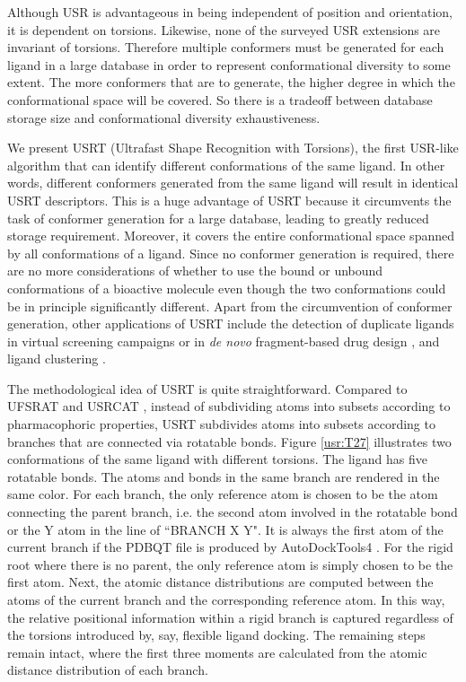 Although USR is advantageous in being independent of position and orientation, it is dependent on torsions. Likewise, none of the surveyed USR extensions are invariant of torsions. Therefore multiple conformers must be generated for each ligand in a large database in order to represent conformational diversity to some extent. The more conformers that are to generate, the higher degree in which the conformational space will be covered. So there is a tradeoff between database storage size and conformational diversity exhaustiveness.

We present USRT (Ultrafast Shape Recognition with Torsions), the first USR-like algorithm that can identify different conformations of the same ligand. In other words, different conformers generated from the same ligand will result in identical USRT descriptors. This is a huge advantage of USRT because it circumvents the task of conformer generation for a large database, leading to greatly reduced storage requirement. Moreover, it covers the entire conformational space spanned by all conformations of a ligand. Since no conformer generation is required, there are no more considerations of whether to use the bound or unbound conformations of a bioactive molecule even though the two conformations could be in principle significantly different. Apart from the circumvention of conformer generation, other applications of USRT include the detection of duplicate ligands in virtual screening campaigns \citep{1390} or in \textit{de novo} fragment-based drug design \citep{1409,1387}, and ligand clustering \citep{1280,1332}.

The methodological idea of USRT is quite straightforward. Compared to UFSRAT \citep{1436} and USRCAT \citep{1331}, instead of subdividing atoms into subsets according to pharmacophoric properties, USRT subdivides atoms into subsets according to branches that are connected via rotatable bonds. Figure \ref{usr:T27} illustrates two conformations of the same ligand with different torsions. The ligand has five rotatable bonds. The atoms and bonds in the same branch are rendered in the same color. For each branch, the only reference atom is chosen to be the atom connecting the parent branch, i.e. the second atom involved in the rotatable bond or the Y atom in the line of ``BRANCH X Y". It is always the first atom of the current branch if the PDBQT file is produced by AutoDockTools4 \citep{596}. For the rigid root where there is no parent, the only reference atom is simply chosen to be the first atom. Next, the atomic distance distributions are computed between the atoms of the current branch and the corresponding reference atom. In this way, the relative positional information within a rigid branch is captured regardless of the torsions introduced by, say, flexible ligand docking. The remaining steps remain intact, where the first three moments are calculated from the atomic distance distribution of each branch.

